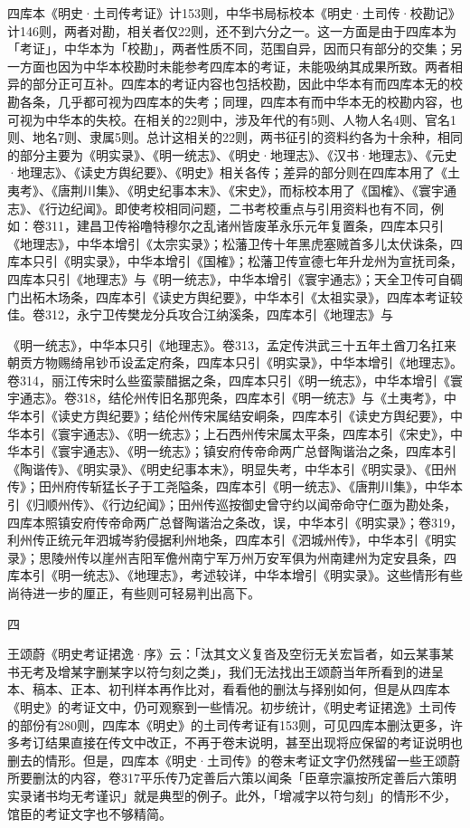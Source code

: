 四库本《明史·土司传考证》计153则，中华书局标校本《明史·土司传·校勘记》计146则，两者对勘，相关者仅22则，还不到六分之一。这一方面是由于四库本为「考证」，中华本为「校勘」，两者性质不同，范围自异，因而只有部分的交集；另一方面也因为中华本校勘时未能参考四库本的考证，未能吸纳其成果所致。两者相异的部分正可互补。四库本的考证内容也包括校勘，因此中华本有而四库本无的校勘各条，几乎都可视为四库本的失考；同理，四库本有而中华本无的校勘内容，也可视为中华本的失校。在相关的22则中，涉及年代的有5则、人物人名4则、官名1则、地名7则、隶属5则。总计这相关的22则，两书征引的资料约各为十余种，相同的部分主要为《明实录》、《明一统志》、《明史·地理志》、《汉书·地理志》、《元史·地理志》、《读史方舆纪要》、《明史》相关各传；差异的部分则在四库本用了《土夷考》、《唐荆川集》、《明史纪事本末》、《宋史》，而标校本用了《国榷》、《寰宇通志》、《行边纪闻》。即使考校相同问题，二书考校重点与引用资料也有不同，例如：卷311，建昌卫传裕噜特穆尔之乱诸州皆废革永乐元年复置条，四库本只引《地理志》，中华本增引《太宗实录》；松藩卫传十年黑虎塞贼首多儿太伏诛条，四库本只引《明实录》，中华本增引《国榷》；松藩卫传宣德七年升龙州为宣抚司条，四库本只引《地理志》与《明一统志》，中华本增引《寰宇通志》；天全卫传可自碉门出柘木场条，四库本引《读史方舆纪要》，中华本引《太祖实录》，四库本考证较佳。卷312，永宁卫传樊龙分兵攻合江纳溪条，四库本引《地理志》与


\noindent 《明一统志》，中华本只引《地理志》。卷313，孟定传洪武三十五年土酋刀名扛来朝贡方物赐绮帛钞币设孟定府条，四库本只引《明实录》，中华本增引《地理志》。卷314，丽江传宋时么些蛮蒙醋据之条，四库本只引《明一统志》，中华本增引《寰宇通志》。卷318，结伦州传旧名那兜条，四库本引《明一统志》与《土夷考》，中华本引《读史方舆纪要》；结伦州传宋属结安峒条，四库本引《读史方舆纪要》，中华本引《寰宇通志》、《明一统志》；上石西州传宋属太平条，四库本引《宋史》，中华本引《寰宇通志》、《明一统志》；镇安府传帝命两广总督陶谐治之条，四库本引《陶谐传》、《明实录》、《明史纪事本末》，明显失考，中华本引《明实录》、《田州传》；田州府传斩猛长子于工尧隘条，四库本引《明一统志》、《唐荆川集》，中华本引《归顺州传》、《行边纪闻》；田州传巡按御史曾守约以闻帝命守仁亟为勘处条，四库本照镇安府传帝命两广总督陶谐治之条改，误，中华本引《明实录》；卷319，利州传正统元年泗城岑豹侵据利州地条，四库本引《泗城州传》，中华本引《明实录》；思陵州传以崖州吉阳军儋州南宁军万州万安军俱为州南建州为定安县条，四库本引《明一统志》、《地理志》，考述较详，中华本增引《明实录》。这些情形有些尚待进一步的厘正，有些则可轻易判出高下。

四

王颂蔚《明史考证捃逸·序》云：「汰其文义复沓及空衍无关宏旨者，如云某事某书无考及增某字删某字以符匀刻之类」，我们无法找出王颂蔚当年所看到的进呈本、稿本、正本、初刊样本再作比对，看看他的删汰与择别如何，但是从四库本《明史》的考证文中，仍可观察到一些情况。初步统计，《明史考证捃逸》土司传的部份有280则，四库本《明史》的土司传考证有153则，可见四库本删汰更多，许多考订结果直接在传文中改正，不再于卷末说明，甚至出现将应保留的考证说明也删去的情形。但是，四库本《明史·土司传》的卷末考证文字仍然残留一些王颂蔚所要删汰的内容，卷317平乐传乃定善后六策以闻条「臣章宗瀛按所定善后六策明实录诸书均无考谨识」就是典型的例子。此外，「增减字以符匀刻」的情形不少，馆臣的考证文字也不够精简。



